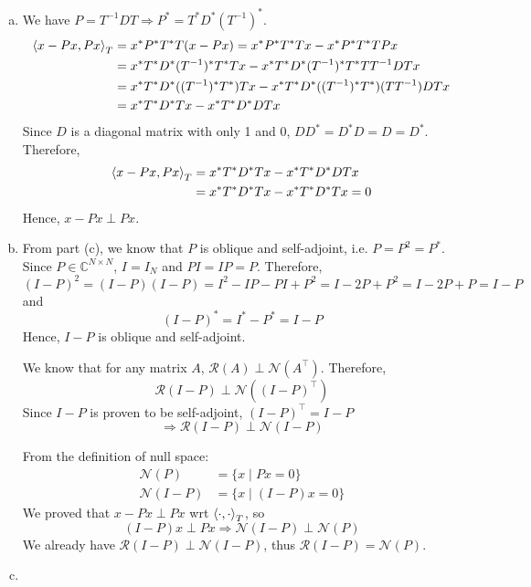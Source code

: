 \begin{enumerate}[(a)]
\item We have $P = T^{-1}DT \Rightarrow P^* = T^* D^* (T^{-1})^*$.
\begin{align*}
	\left\langle x-Px, Px \right\rangle_T 
	&= x^* P^* T^* T (x - Px) = x^* P^* T^* T x - x^* P^* T^* T P x \\
	&= x^* T^* D^* (T^{-1})^* T^* T x - x^* T^* D^* (T^{-1})^* T^* T T^{-1}DT x \\
	&= x^* T^* D^* ((T^{-1})^* T^*) T x - x^* T^* D^* ((T^{-1})^* T^*) (T T^{-1})DT x \\
	&= x^* T^* D^* T x - x^* T^* D^* DT x
\end{align*}
Since $D$ is a diagonal matrix with only 1 and 0, $D D^* = D^* D = D = D^*$. Therefore,
\begin{align*}
	\left\langle x-Px, Px \right\rangle_T 
	&= x^* T^* D^* T x - x^* T^* D^* DT x \\
	&= x^* T^* D^* T x - x^* T^* D^* T x = 0
\end{align*}
Hence, $x-Px \perp Px$.

\item From part (c), we know that $P$ is oblique and self-adjoint, i.e. $P = P^2 = P^*$. Since $P \in \mathbb{C}^{N \times N}$, $I = I_N$ and $PI = IP = P$. Therefore,
\[(I-P)^2 = (I-P)(I-P) = I^2 - IP - PI + P^2 = I - 2P + P^2 = I - 2P + P = I - P\]
and
\[(I-P)^* = I^* - P^* = I - P\]
Hence, $I-P$ is oblique and self-adjoint.

We know that for any matrix $A$, $\mathcal{R}(A) \perp \mathcal{N}(A^\top)$. Therefore,
\[\mathcal{R}(I-P) \perp \mathcal{N}((I-P)^\top)\]
Since $I-P$ is proven to be self-adjoint, $(I-P)^\top = I-P$
\[\Rightarrow \mathcal{R}(I-P) \perp \mathcal{N}(I-P)\]

From the definition of null space:
\begin{align*}
	\mathcal{N}(P) &= \{x \mid Px = 0\} \\
	\mathcal{N}(I-P) &= \{x \mid (I-P)x = 0\}
\end{align*}
We proved that $x-Px \perp Px$ wrt $\left\langle \cdot, \cdot \right\rangle_T$, so 
\[(I-P)x \perp Px \Rightarrow \mathcal{N}(I-P) \perp \mathcal{N}(P)\]
We already have $\mathcal{R}(I-P) \perp \mathcal{N}(I-P)$, thus $\mathcal{R}(I-P) = \mathcal{N}(P)$.

\item 
\end{enumerate}